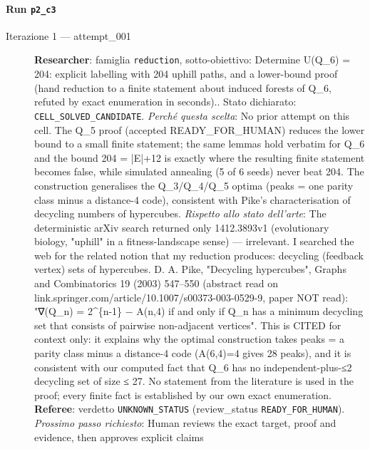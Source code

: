 \documentclass[11pt,a4paper]{article}
\begin{document}
\paragraph{Run \texttt{p2\_c3}}
\begin{description}
\item[Iterazione 1 — attempt\_001]
\textbf{Researcher}: famiglia \texttt{reduction}, sotto-obiettivo: Determine U(Q\_6) = 204: explicit labelling with 204 uphill paths, and a lower-bound proof (hand reduction to a finite statement about induced forests of Q\_6, refuted by exact enumeration in seconds).. Stato dichiarato: \texttt{CELL\_SOLVED\_CANDIDATE}.
\emph{Perché questa scelta}: No prior attempt on this cell. The Q\_5 proof (accepted READY\_FOR\_HUMAN) reduces the lower bound to a small finite statement; the same lemmas hold verbatim for Q\_6 and the bound 204 = |E|+12 is exactly where the resulting finite statement becomes false, while simulated annealing (5 of 6 seeds) never beat 204. The construction generalises the Q\_3/Q\_4/Q\_5 optima (peaks = one parity class minus a distance-4 code), consistent with Pike's characterisation of decycling numbers of hypercubes.
\emph{Rispetto allo stato dell'arte}: The deterministic arXiv search returned only 1412.3893v1 (evolutionary biology, "uphill" in a fitness-landscape sense) — irrelevant. I searched the web for the related notion that my reduction produces: decycling (feedback vertex) sets of hypercubes. D. A. Pike, "Decycling hypercubes", Graphs and Combinatorics 19 (2003) 547–550 (abstract read on link.springer.com/article/10.1007/s00373-003-0529-9, paper NOT read): "∇(Q\_n) = 2\textasciicircum{}\{n-1\} − A(n,4) if and only if Q\_n has a minimum decycling set that consists of pairwise non-adjacent vertices". This is CITED for context only: it explains why the optimal construction takes peaks = a parity class minus a distance-4 code (A(6,4)=4 gives 28 peaks), and it is consistent with our computed fact that Q\_6 has no independent-plus-≤2 decycling set of size ≤ 27. No statement from the literature is used in the proof; every finite fact is established by our own exact enumeration.
\textbf{Referee}: verdetto \texttt{UNKNOWN\_STATUS} (review\_status \texttt{READY\_FOR\_HUMAN}).
\emph{Prossimo passo richiesto}: Human reviews the exact target, proof and evidence, then approves explicit claims
\end{description}
\end{document}
